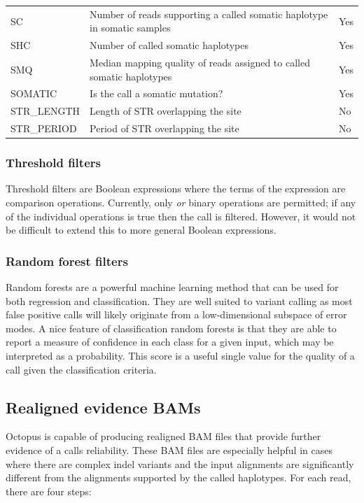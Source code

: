 \documentclass{article}
\begin{document}
\begin{center}
\begin{tabular}{lll}
SC & Number of reads supporting a called somatic haplotype in somatic samples & Yes \\
SHC & Number of called somatic haplotypes & Yes \\
SMQ & Median mapping quality of reads assigned to called somatic haplotypes & Yes \\
SOMATIC & Is the call a somatic mutation? & Yes \\
STR\_LENGTH & Length of STR overlapping the site & No \\
STR\_PERIOD & Period of STR overlapping the site & No \\
\hline
\end{tabular}
\end{center}

\subsubsection{Threshold filters}

Threshold filters are Boolean expressions where the terms of the expression are comparison operations. Currently, only \emph{or} binary operations are permitted; if any of the individual operations is true then the call is filtered. However, it would not be difficult to extend this to more general Boolean expressions.

\subsubsection{Random forest filters}

Random forests are a powerful machine learning method that can be used for both regression and classification. They are well suited to variant calling as most false positive calls will likely originate from a low-dimensional subspace of error modes. A nice feature of classification random forests is that they are able to report a measure of confidence in each class for a given input, which may be interpreted as a probability. This score is a useful single value for the quality of a call given the classification criteria.

\subsection{Realigned evidence BAMs}\label{bam-realignments}

Octopus is capable of producing realigned BAM files that provide further evidence of a calls reliability. These BAM files are especially helpful in cases where there are complex indel variants and the input alignments are significantly different from the alignments supported by the called haplotypes. For each read, there are four steps:
\end{document}
